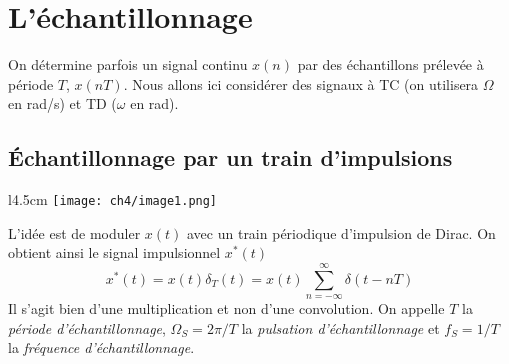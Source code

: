\chapter{L’échantillonnage}
On détermine parfois un signal continu $x(n)$ par des échantillons prélevée à période $T$, 
$x(nT)$. Nous allons ici considérer des signaux à TC (on utilisera $\Omega$ en rad/s) et 
TD ($\omega$ en rad).

	\section{Échantillonnage par un train d'impulsions}
	\begin{wrapfigure}[12]{l}{4.5cm}
	\vspace{-5mm}
	\texttt{[image: ch4/image1.png]}
	\end{wrapfigure}
	L'idée est de moduler $x(t)$ avec un train périodique d'impulsion de Dirac. On obtient 
	ainsi le signal impulsionnel $x^*(t)$ 
	\begin{equation}
	x^*(t) = x(t)\delta_T(t) = x(t)\sum_{n=-\infty}^\infty \delta(t-nT)
	\end{equation}
	Il s'agit bien d'une multiplication et non d'une convolution.  On appelle $T$ la 
	\textit{période d’échantillonnage}, $\Omega_S = 2\pi/T$ la \textit{pulsation d’échantillonnage} 
	et $f_S=1/T$ la \textit{fréquence d’échantillonnage}.\\
	
